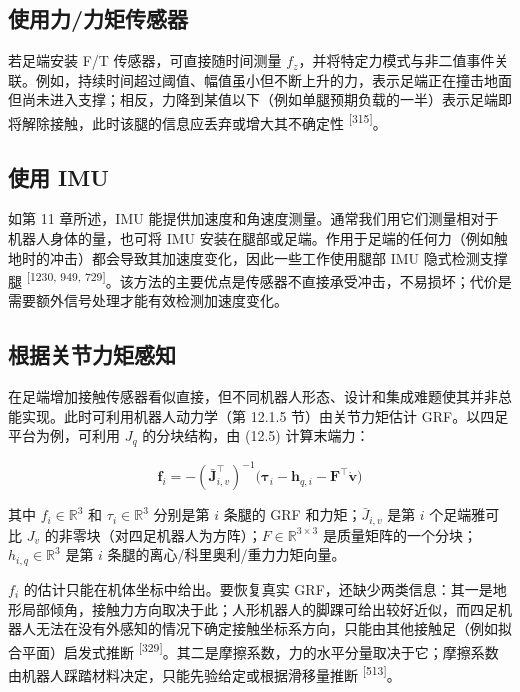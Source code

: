 \subsection{使用力/力矩传感器}

若足端安装 F/T 传感器，可直接随时间测量 $f_z$，并将特定力模式与非二值事件关联。例如，持续时间超过阈值、幅值虽小但不断上升的力，表示足端正在撞击地面但尚未进入支撑；相反，力降到某值以下（例如单腿预期负载的一半）表示足端即将解除接触，此时该腿的信息应丢弃或增大其不确定性 \textsuperscript{[315]}。

\subsection{使用 IMU}

如第 11 章所述，IMU 能提供加速度和角速度测量。通常我们用它们测量相对于机器人身体的量，也可将 IMU 安装在腿部或足端。作用于足端的任何力（例如触地时的冲击）都会导致其加速度变化，因此一些工作使用腿部 IMU 隐式检测支撑腿 \textsuperscript{[1230, 949, 729]}。该方法的主要优点是传感器不直接承受冲击，不易损坏；代价是需要额外信号处理才能有效检测加速度变化。

\subsection{根据关节力矩感知}

在足端增加接触传感器看似直接，但不同机器人形态、设计和集成难题使其并非总能实现。此时可利用机器人动力学（第 12.1.5 节）由关节力矩估计 GRF。以四足平台为例，可利用 $J_q$ 的分块结构，由 (12.5) 计算末端力：

\begin{equation}
\boldsymbol {f} _ {i} = - (\bar {\boldsymbol {J}} _ {i, v} ^ {\top}) ^ {- 1} \big (\boldsymbol {\tau} _ {i} - \boldsymbol {h} _ {q, i} - \boldsymbol {F} ^ {\top} \dot {\boldsymbol {v}} \big)\tag{12.25}
\end{equation}

其中 $f_i\in\mathbb{R}^3$ 和 $\tau_i\in\mathbb{R}^3$ 分别是第 $i$ 条腿的 GRF 和力矩；$\bar J_{i,v}$ 是第 $i$ 个足端雅可比 $J_v$ 的非零块（对四足机器人为方阵）；$F\in\mathbb{R}^{3\times3}$ 是质量矩阵的一个分块；$h_{i,q}\in\mathbb{R}^3$ 是第 $i$ 条腿的离心/科里奥利/重力力矩向量。

$f_i$ 的估计只能在机体坐标中给出。要恢复真实 GRF，还缺少两类信息：其一是地形局部倾角，接触力方向取决于此；人形机器人的脚踝可给出较好近似，而四足机器人无法在没有外感知的情况下确定接触坐标系方向，只能由其他接触足（例如拟合平面）启发式推断 \textsuperscript{[329]}。其二是摩擦系数，力的水平分量取决于它；摩擦系数由机器人踩踏材料决定，只能先验给定或根据滑移量推断 \textsuperscript{[513]}。

